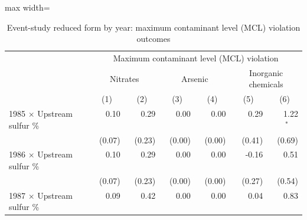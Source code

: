 \begin{table}[htbp]
\raggedright
\begin{minipage}{\linewidth}
\caption{\label{tab:es_rf_coefs_mcl_k2} Event-study reduced form by year: maximum contaminant level (MCL) violation outcomes}
\end{minipage}
\small
{\setlength{\tabcolsep}{4pt}%
\begin{adjustbox}{max width=\linewidth}
\begin{tabular}{lrrrrrr}
\toprule
 & \multicolumn{6}{c}{Maximum contaminant level (MCL) violation} \\
 & \multicolumn{2}{c}{Nitrates} & \multicolumn{2}{c}{Arsenic} & \multicolumn{2}{c}{Inorganic chemicals} \\
 & \multicolumn{1}{c}{(1)} & \multicolumn{1}{c}{(2)} & \multicolumn{1}{c}{(3)} & \multicolumn{1}{c}{(4)} & \multicolumn{1}{c}{(5)} & \multicolumn{1}{c}{(6)} \\
\hline
1985 $\times$ Upstream sulfur \% & \phantom{(}\phantom{-}0.10$^{\phantom{*}\phantom{*}\phantom{*}}$ & \phantom{(}\phantom{-}0.29$^{\phantom{*}\phantom{*}\phantom{*}}$ & \phantom{(}\phantom{-}0.00$^{\phantom{*}\phantom{*}\phantom{*}}$ & \phantom{(}\phantom{-}0.00$^{\phantom{*}\phantom{*}\phantom{*}}$ & \phantom{(}\phantom{-}0.29$^{\phantom{*}\phantom{*}\phantom{*}}$ & \phantom{(}\phantom{-}1.22$^{*\phantom{*}\phantom{*}}$ \\
 & (\phantom{-}0.07)\phantom{$^{***}$} & (\phantom{-}0.23)\phantom{$^{***}$} & (\phantom{-}0.00)\phantom{$^{***}$} & (\phantom{-}0.00)\phantom{$^{***}$} & (\phantom{-}0.41)\phantom{$^{***}$} & (\phantom{-}0.69)\phantom{$^{***}$} \\
1986 $\times$ Upstream sulfur \% & \phantom{(}\phantom{-}0.10$^{\phantom{*}\phantom{*}\phantom{*}}$ & \phantom{(}\phantom{-}0.29$^{\phantom{*}\phantom{*}\phantom{*}}$ & \phantom{(}\phantom{-}0.00$^{\phantom{*}\phantom{*}\phantom{*}}$ & \phantom{(}\phantom{-}0.00$^{\phantom{*}\phantom{*}\phantom{*}}$ & \phantom{(}-0.16$^{\phantom{*}\phantom{*}\phantom{*}}$ & \phantom{(}\phantom{-}0.51$^{\phantom{*}\phantom{*}\phantom{*}}$ \\
 & (\phantom{-}0.07)\phantom{$^{***}$} & (\phantom{-}0.23)\phantom{$^{***}$} & (\phantom{-}0.00)\phantom{$^{***}$} & (\phantom{-}0.00)\phantom{$^{***}$} & (\phantom{-}0.27)\phantom{$^{***}$} & (\phantom{-}0.54)\phantom{$^{***}$} \\
1987 $\times$ Upstream sulfur \% & \phantom{(}\phantom{-}0.09$^{\phantom{*}\phantom{*}\phantom{*}}$ & \phantom{(}\phantom{-}0.42$^{\phantom{*}\phantom{*}\phantom{*}}$ & \phantom{(}\phantom{-}0.00$^{\phantom{*}\phantom{*}\phantom{*}}$ & \phantom{(}\phantom{-}0.00$^{\phantom{*}\phantom{*}\phantom{*}}$ & \phantom{(}\phantom{-}0.04$^{\phantom{*}\phantom{*}\phantom{*}}$ & \phantom{(}\phantom{-}0.83$^{\phantom{*}\phantom{*}\phantom{*}}$ \\

\end{tabular}
\end{adjustbox}}
\end{table}
